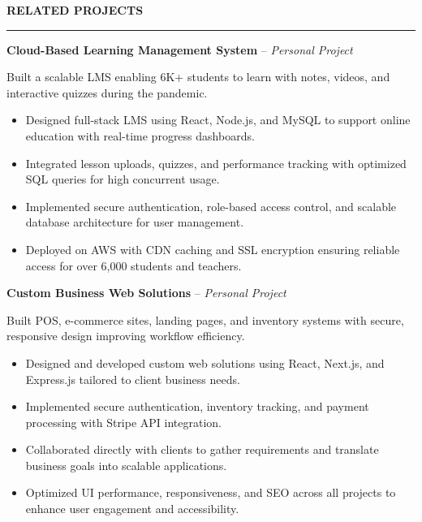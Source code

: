 \documentclass[10pt,letterpaper]{article}
\begin{document}
\vspace{6pt}

\textbf{RELATED PROJECTS}\\[-8pt]
\noindent\rule{\textwidth}{1pt}

\vspace{-2pt}

\textbf{Cloud-Based Learning Management System} -- \emph{Personal Project}

\vspace{-1pt}

Built a scalable LMS enabling 6K+ students to learn with notes, videos, and interactive quizzes during the pandemic.
\vspace{-1pt}
\begin{itemize}
\item Designed full-stack LMS using React, Node.js, and MySQL to support online education with real-time progress dashboards.
\item Integrated lesson uploads, quizzes, and performance tracking with optimized SQL queries for high concurrent usage.
\item Implemented secure authentication, role-based access control, and scalable database architecture for user management.
\item Deployed on AWS with CDN caching and SSL encryption ensuring reliable access for over 6,000 students and teachers.
\end{itemize}

\textbf{Custom Business Web Solutions} -- \emph{Personal Project}

\vspace{-1pt}

Built POS, e-commerce sites, landing pages, and inventory systems with secure, responsive design improving workflow efficiency.
\vspace{-1pt}
\begin{itemize}
\item Designed and developed custom web solutions using React, Next.js, and Express.js tailored to client business needs.
\item Implemented secure authentication, inventory tracking, and payment processing with Stripe API integration.
\item Collaborated directly with clients to gather requirements and translate business goals into scalable applications.
\item Optimized UI performance, responsiveness, and SEO across all projects to enhance user engagement and accessibility.
\end{itemize}
\end{document}
